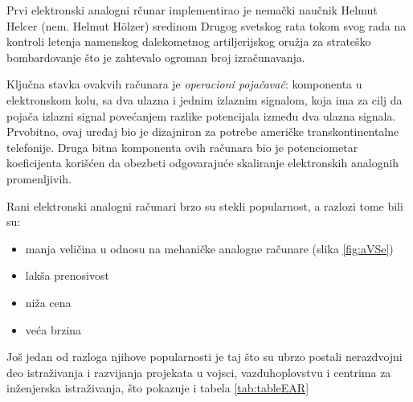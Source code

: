 \documentclass[a4paper]{article}
\begin{document}
		\bigskip
		
		\par Prvi elektronski analogni rčunar implementirao je nemački naučnik Helmut Helcer (nem. Helmut Hölzer) sredinom Drugog svetskog rata tokom svog rada na kontroli letenja namenskog dalekometnog artiljerijskog oružja za strateško bombardovanje što je zahtevalo ogroman broj izračunavanja. \cite{Holzer}
		
		\bigskip
		
		\par Ključna stavka ovakvih računara je \emph{operacioni pojačavač}: komponenta u elektronskom kolu, sa dva ulazna i jednim izlaznim signalom, koja ima za cilj da pojača izlazni signal povećanjem razlike potencijala između dva ulazna signala. Prvobitno, ovaj uređaj bio je dizajniran za potrebe američke transkontinentalne telefonije. Druga bitna komponenta ovih računara bio je potenciometar koeficijenta korišćen da obezbeti odgovarajuće skaliranje elektronskih analognih promenljivih.
		
		\bigskip
		
		\par Rani elektronski analogni računari brzo su stekli popularnost, a razlozi tome bili su:
		\begin{itemize}
			\item manja veličina u odnosu na mehaničke analogne računare (slika \ref{fig:aVSe})
			\item lakša prenosivost
			\item niža cena
			\item  veća brzina
		\end{itemize}
		Još jedan od razloga njihove popularnosti je taj što su ubrzo postali nerazdvojni deo istraživanja i razvijanja projekata u vojsci, vazduhoplovstvu i centrima za inženjerska istraživanja, što pokazuje i tabela \ref{tab:tableEAR} \cite{table}
		
		\bigskip
	
\end{document}
